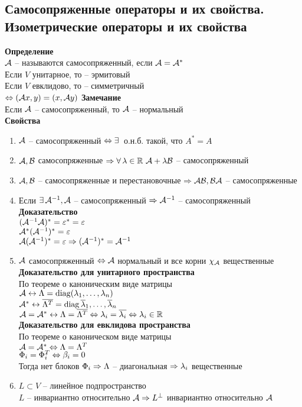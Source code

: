 \documentclass[12pt]{article}
\begin{document}
\subsection{Самосопряженные операторы и их свойства. Изометрические операторы и их свойства}
\textbf{Определение}\\
$\mathcal{A}$ -- называются самосопряженный, если $\mathcal{A} = \mathcal{A}^*$\\
Если $V$ унитарное, то -- эрмитовый\\
Если $V$ евклидово, то -- симметричный\\
$\Leftrightarrow (\mathcal{A} x, y) = (x, \mathcal{A} y)$
\textbf{Замечание}\\
Если $\mathcal{A}$ -- самосопряженный, то $\mathcal{A}$ -- нормальный\\
\textbf{Свойства}
\begin{enumerate}
    \item $\mathcal{A}$ -- самосопряженный $\Leftrightarrow \exists\,$ о.н.б. такой, что $A^* = A$
    \item $\mathcal{A}, \mathcal{B}$ самосопряженные $\Rightarrow \forall\, \lambda \in \mathbb{R}\ \mathcal{A} + \lambda\mathcal{B}$ -- самосопряженный
    \item $\mathcal{A}, \mathcal{B}$ -- самосопряженные и перестановочные $\Rightarrow \mathcal{A}\mathcal{B}, \mathcal{B}\mathcal{A}$ -- самосопряженные
    \item Если $\exists\, \mathcal{A}^{-1}, \mathcal{A}$ -- самосопряженный $\Rightarrow \mathcal{A}^{-1}$ -- самосопряженный\\
    \textbf{Доказательство}\\
    $(\mathcal{A}^{-1}\mathcal{A})^* = \varepsilon^* = \varepsilon$\\
    $\mathcal{A}^* (\mathcal{A}^{-1})^* = \varepsilon$\\
    $\mathcal{A}(\mathcal{A}^{-1})^* = \varepsilon \Rightarrow (\mathcal{A}^{-1})^* = \mathcal{A}^{-1}$
    \item $\mathcal{A}$ самосопряженный $\Leftrightarrow \mathcal{A}$ нормальный и все корни $\chi_\mathcal{A}$ вещественные\\
        \textbf{Доказательство для унитарного пространства}\\
        По теореме о каноническим виде матрицы\\
        $\mathcal{A} \leftrightarrow \Lambda = \operatorname{diag}( \lambda_1, \ldots, \lambda_n)$\\
        $\mathcal{A}^* \leftrightarrow \overline{ \Lambda^T} = \operatorname{diag}{\overline \lambda_1, \ldots, \overline \lambda_n}$\\
        $\mathcal{A} = \mathcal{A}^* \leftrightarrow \Lambda = \overline{ \Lambda^T} \Leftrightarrow \lambda_i = \overline{ \lambda_i} \Leftrightarrow \lambda_i \in \mathbb{R}$\\
        \textbf{Доказательство для евклидова пространства}\\
        По теореме о каноническом виде матрицы\\
        $\mathcal{A} = \mathcal{A}^* \Leftrightarrow \Lambda = \Lambda^T$\\
        $ \Phi_i = \Phi_i^T \Leftrightarrow \beta_i = 0$\\
        Тогда нет блоков $ \Phi_i \Rightarrow \Lambda$ -- диагональная $\Rightarrow \lambda_i$ вещественные
    \item $L \subset V$ -- линейное подпространство\\
        $L$ -- инвариантно относительно $\mathcal{A} \Rightarrow L^\perp$ инвариантно относительно $\mathcal{A}$
\end{enumerate}
\end{document}
